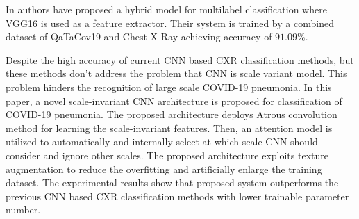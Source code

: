 In \cite{hyp} authors have proposed a hybrid model for multilabel classification where VGG16 is used as a feature extractor. Their system is trained by a combined dataset of QaTaCov19 and Chest X-Ray achieving accuracy of $91.09$\%.

Despite the high accuracy of current CNN based CXR classification methods, but these methods don't address the problem that CNN is scale variant model. This problem hinders the recognition of large scale COVID-19 pneumonia. In this paper, a novel scale-invariant CNN architecture is proposed for classification of COVID-19 pneumonia. The proposed architecture deploys Atrous convolution method for learning the scale-invariant features. Then, an attention model is utilized to automatically and internally select at which scale  CNN should consider and ignore other scales. The proposed architecture exploits texture augmentation to reduce the overfitting and artificially enlarge the training dataset. The experimental results show that proposed system outperforms  the previous  CNN based CXR classification methods  with lower trainable parameter number.


